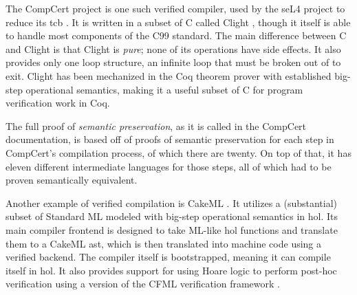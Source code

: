 The CompCert project is one such verified compiler,
used by the seL4 project to reduce its \ac{tcb} \autocite{Klein_AEMSKH_14}.
It is written in a subset of C
called Clight \autocite{leroy:compcert,blazy2009clight},
though it itself is able to handle most components of the C99 standard.
The main difference between C and Clight is that Clight is \emph{pure};
none of its operations have side effects. It also provides only one loop structure,
an infinite loop that must be broken out of to exit.
Clight has been mechanized in the Coq theorem prover with established
big-step operational semantics, making it a useful subset of C
for program verification work in Coq.

The full proof of \emph{semantic preservation},
as it is called in the CompCert documentation,
is based off of proofs of semantic preservation
for each step in CompCert's compilation process, of which there are twenty.
On top of that, it has eleven different intermediate languages for those steps,
all of which had to be proven semantically equivalent.

Another example of verified compilation is CakeML \autocite{kumar2014cakeml}.
It utilizes a (substantial)
subset of Standard ML modeled with big-step operational semantics in \ac{hol}.
Its main compiler frontend is designed to take ML-like \ac{hol} functions
and translate them to a CakeML \ac{ast}, which is then translated into machine code
using a verified backend. The compiler itself is bootstrapped,
meaning it can compile itself in \ac{hol}. It also provides support for using Hoare logic
to perform post-hoc verification using a version of the CFML verification framework
\autocite{gueneau2017formulae,arthur2015union,chargueraud2011cfv}.

